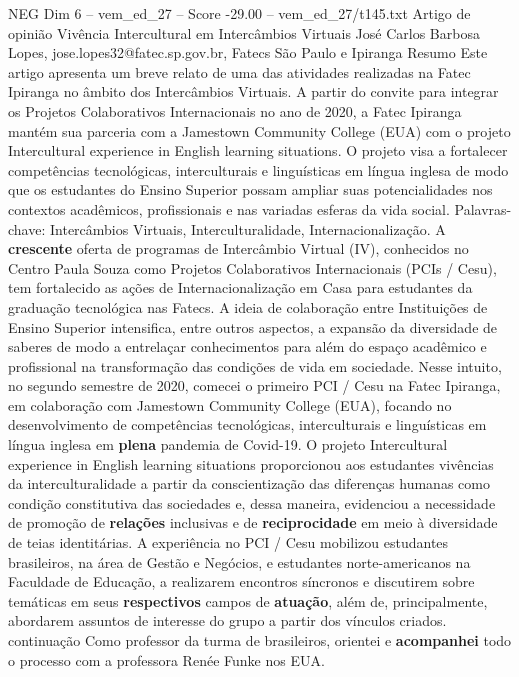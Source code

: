 \begin{textsample}{NEG Dim 6 – vem\_ed\_27 – Score -29.00 – vem\_ed\_27/t145.txt}  \label{ex:f6_neg_012}
Artigo de opinião Vivência Intercultural em Intercâmbios Virtuais José Carlos Barbosa Lopes, jose.lopes32@fatec.sp.gov.br, Fatecs São Paulo e Ipiranga Resumo Este artigo apresenta um breve relato de uma das atividades realizadas na Fatec Ipiranga no âmbito dos Intercâmbios Virtuais.
A partir do convite para integrar os Projetos Colaborativos Internacionais no ano de 2020, a Fatec Ipiranga mantém sua parceria com a Jamestown Community College (EUA) com o projeto Intercultural experience in English learning situations.
O projeto visa a fortalecer competências tecnológicas, interculturais e linguísticas em língua inglesa de modo que os estudantes do Ensino Superior possam ampliar suas potencialidades nos contextos acadêmicos, profissionais e nas variadas esferas da vida social.
Palavras-chave: Intercâmbios Virtuais, Interculturalidade, Internacionalização.
A \textbf{crescente} oferta de programas de Intercâmbio Virtual (IV), conhecidos no Centro Paula Souza como Projetos Colaborativos Internacionais (PCIs / Cesu), tem fortalecido as ações de Internacionalização em Casa para estudantes da graduação tecnológica nas Fatecs.
A ideia de colaboração entre Instituições de Ensino Superior intensifica, entre outros aspectos, a expansão da diversidade de saberes de modo a entrelaçar conhecimentos para além do espaço acadêmico e profissional na transformação das condições de vida em sociedade.
Nesse intuito, no segundo semestre de 2020, comecei o primeiro PCI / Cesu na Fatec Ipiranga, em colaboração com Jamestown Community College (EUA), focando no desenvolvimento de competências tecnológicas, interculturais e linguísticas em língua inglesa em \textbf{plena} pandemia de Covid-19.
O projeto Intercultural experience in English learning situations proporcionou aos estudantes vivências da interculturalidade a partir da conscientização das diferenças humanas como condição constitutiva das sociedades e, dessa maneira, evidenciou a necessidade de promoção de \textbf{relações} inclusivas e de \textbf{reciprocidade} em meio à diversidade de teias identitárias.
A experiência no PCI / Cesu mobilizou estudantes brasileiros, na área de Gestão e Negócios, e estudantes norte-americanos na Faculdade de Educação, a realizarem encontros síncronos e discutirem sobre temáticas em seus \textbf{respectivos} campos de \textbf{atuação}, além de, principalmente, abordarem assuntos de interesse do grupo a partir dos vínculos criados. continuação Como professor da turma de brasileiros, orientei e \textbf{acompanhei} todo o processo com a professora Renée Funke nos EUA.

\end{textsample}
